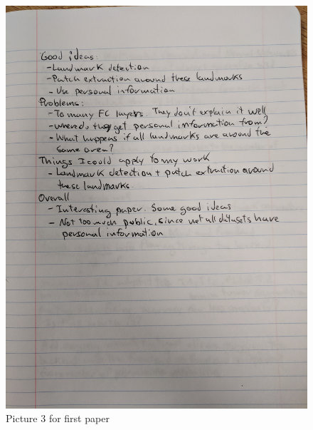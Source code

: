 \documentclass{article}
\begin{document}
\begin{figure}[h!]
\centering
\includegraphics[width=12cm]{paper1_3.jpg}
\caption{Picture 3 for first paper}
\label{fig:paper1_3}
\end{figure}
\end{document}
